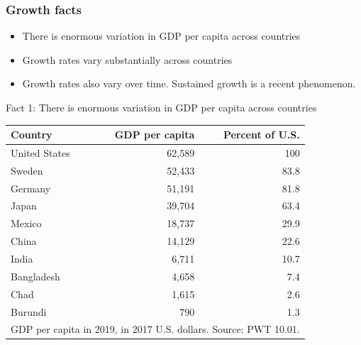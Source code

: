 \documentclass[10pt]{beamer}
\begin{document}
\begin{frame}
\frametitle{Growth facts}
\begin{itemize}
\item There is enormous variation in GDP per capita across countries \medskip
\item Growth rates vary substantially across countries \medskip
\item Growth rates also vary over time. Sustained growth is a recent phenomenon.
\end{itemize}
\end{frame}

\begin{frame}{Fact 1: There is enormous variation in GDP per capita across countries}
\small{
\begin{table}
    \centering
    \begin{tabular}{l r r}
         Country&GDP per capita &Percent of U.S.\\
         \hline
         United States&62,589&100\\
         Sweden& 52,433 &83.8 \\
         Germany&51,191 &81.8 \\
         Japan& 39,704 &63.4 \\
         Mexico& 18,737&29.9\\
         China& 14,129 &22.6 \\
         India&6,711&10.7\\
         Bangladesh& 4,658 &7.4 \\
         Chad& 1,615&2.6\\
         Burundi& 790&1.3\\
         \hline
         \multicolumn{3}{l}{\tiny{GDP per capita in 2019, in 2017 U.S. dollars. Source: PWT 10.01.}}
    \end{tabular}
\end{table}
}
\end{frame}
\end{document}

